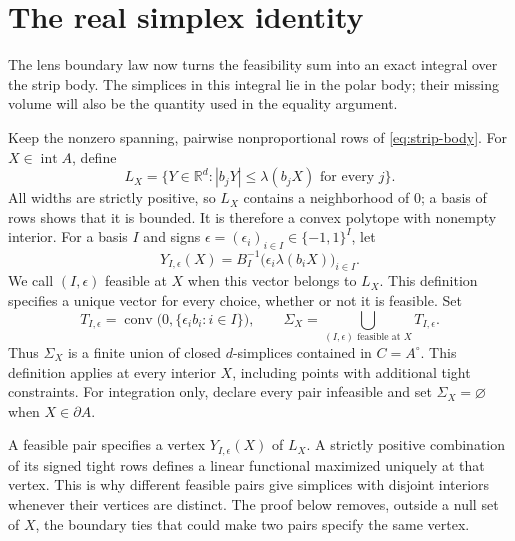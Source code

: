 \section{The real simplex identity}\label{sec:simplex}

The lens boundary law now turns the feasibility sum into an exact integral over the strip body. The simplices in this integral lie in the polar body; their missing volume will also be the quantity used in the equality argument.

Keep the nonzero spanning, pairwise nonproportional rows of \eqref{eq:strip-body}. For $X\in\operatorname{int}A$, define
\begin{equation}\label{eq:real-feasibility-body}
 L_X=\{Y\in\mathbb{R}^d:|b_jY|\leq\lambda(b_jX)
                         \text{ for every }j\}.
\end{equation}
All widths are strictly positive, so $L_X$ contains a neighborhood of $0$; a basis of rows shows that it is bounded. It is therefore a convex polytope with nonempty interior. For a basis $I$ and signs $\epsilon=(\epsilon_i)_{i\in I}\in\{-1,1\}^I$, let
\[
 Y_{I,\epsilon}(X)=B_I^{-1}
          \bigl(\epsilon_i\lambda(b_iX)\bigr)_{i\in I}.
\]
We call $(I,\epsilon)$ feasible at $X$ when this vector belongs to $L_X$. This definition specifies a unique vector for every choice, whether or not it is feasible. Set
\begin{equation}\label{eq:feasible-simplex-union}
 T_{I,\epsilon}=\operatorname{conv}
                  \bigl(0,\{\epsilon_i b_i:i\in I\}\bigr),
 \qquad
 \Sigma_X=\bigcup_{(I,\epsilon)\text{ feasible at }X}T_{I,\epsilon}.
\end{equation}
Thus $\Sigma_X$ is a finite union of closed $d$-simplices contained in $C=A^\circ$. This definition applies at every interior $X$, including points with additional tight constraints. For integration only, declare every pair infeasible and set $\Sigma_X=\varnothing$ when $X\in\partial A$.

A feasible pair specifies a vertex $Y_{I,\epsilon}(X)$ of $L_X$. A strictly positive combination of its signed tight rows defines a linear functional maximized uniquely at that vertex. This is why different feasible pairs give simplices with disjoint interiors whenever their vertices are distinct. The proof below removes, outside a null set of $X$, the boundary ties that could make two pairs specify the same vertex.

